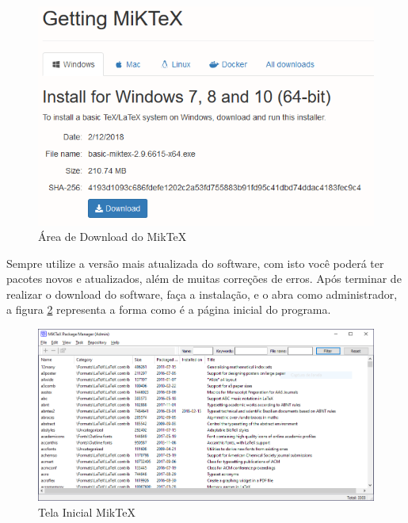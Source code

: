 \begin{figure}[htb]
	\caption{Área de Download do MikTeX \label{fig_Cap1_downloadMikTex}}
	\begin{center}
		\includegraphics[scale=0.4]{./Imagens/Capitulo_1/downloadMikTeX.png}
	\end{center}
\end{figure}

Sempre utilize a versão mais atualizada do software, com isto você poderá ter pacotes novos e atualizados, além de muitas correções de erros. Após terminar de realizar o download do software, faça a instalação, e o abra como administrador, a figura \ref{fig_Cap1_MikTeX} representa a forma como é a página inicial do programa.

\begin{figure}[htb]
	\caption{Tela Inicial MikTeX \label{fig_Cap1_MikTeX}}
	\begin{center}
		\includegraphics[scale=0.4]{./Imagens/Capitulo_1/MikTeX.png}
	\end{center}
\end{figure}


